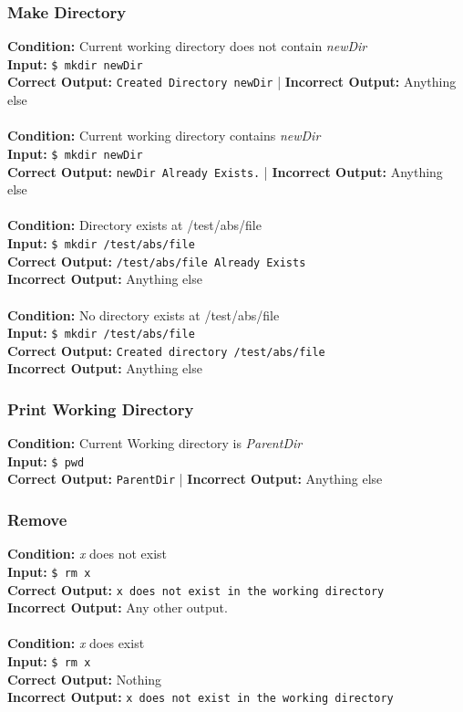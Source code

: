 \documentclass[12pt, letterpaper]{article}
\begin{document}
\subsubsection{Make Directory}
\textbf{Condition:}  Current working directory does not contain \emph{newDir} \\
\textbf{Input:} \texttt{\$ mkdir newDir}\\
\textbf{Correct Output:} \texttt{Created Directory newDir} | \textbf{Incorrect Output:} Anything else\\
\\
\textbf{Condition:}  Current working directory contains \emph{newDir} \\
\textbf{Input:} \texttt{\$ mkdir newDir}\\
\textbf{Correct Output:} \texttt{newDir Already Exists.} | \textbf{Incorrect Output:} Anything else\\
\\
\textbf{Condition:}  Directory exists at /test/abs/file \\
\textbf{Input:} \texttt{\$ mkdir /test/abs/file}\\
\textbf{Correct Output:} \texttt{/test/abs/file Already Exists}\\
\textbf{Incorrect Output:} Anything else\\
\\
\textbf{Condition:}  No directory exists at /test/abs/file \\
\textbf{Input:} \texttt{\$ mkdir /test/abs/file}\\
\textbf{Correct Output:} \texttt{Created directory /test/abs/file}\\
\textbf{Incorrect Output:} Anything else\\

\subsubsection{Print Working Directory}
\textbf{Condition: } Current Working directory is \emph{ParentDir} \\
\textbf{Input:}  \texttt{\$ pwd} \\
\textbf{Correct Output:} \texttt{ParentDir} | \textbf{Incorrect Output:} Anything else

\subsubsection{Remove}
\textbf{Condition: } \emph{x} does not exist\\
\textbf{Input:}  \texttt{\$ rm x} \\
\textbf{Correct Output:} \texttt{x does not exist in the working directory}\\ \textbf{Incorrect Output:} Any other output.\\
\\
\textbf{Condition: } \emph{x} does exist\\
\textbf{Input:}  \texttt{\$ rm x} \\
\textbf{Correct Output:} Nothing\\
\textbf{Incorrect Output:} \texttt{x does not exist in the working directory}\\
\end{document}
